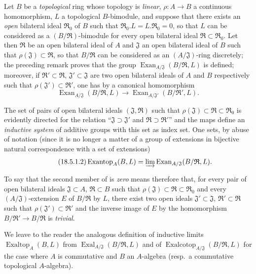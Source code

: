 \begin{env}[18.5.1]
\label{0.18.5.1}
Let $B$ be a \emph{topological} ring whose topology is \emph{linear}, $\rho:A\to B$ a continuous homomorphism, $L$ a topological $B$-bimodule, and suppose that there exists an \emph{open} bilateral ideal $\mathfrak{R}_0$ of $B$ such that $\mathfrak{R}_0.L=L.\mathfrak{R}_0=0$, so that $L$ can be
considered as a $(B/\mathfrak{R})$-bimodule for every open bilateral ideal $\mathfrak{R}\subset\mathfrak{R}_0$.
Let then $\mathfrak{R}$ be an open bilateral ideal of $A$ and $\mathfrak{J}$ an open bilateral ideal of $B$ such that $\rho(\mathfrak{J})\subset\mathfrak{R}$, so that $B/\mathfrak{R}$ can be considered as an $(A/\mathfrak{J})$-ring discretely; the preceding remark proves that the group $\operatorname{Exan}_{A/\mathfrak{J}}(B/\mathfrak{R},L)$ is defined; moreover, if $\mathfrak{R}'\subset\mathfrak{R}$, $\mathfrak{J}'\subset\mathfrak{J}$ are two open bilateral ideals of $A$ and $B$ respectively such that $\rho(\mathfrak{J}')\subset\mathfrak{R}'$, one has by  a canonical homomorphism
\begin{equation}
\tag{18.5.1.1}
  \label{0.18.5.1.1}
  \operatorname{Exan}_{A/\mathfrak{J}}(B/\mathfrak{R},L)\to\operatorname{Exan}_{A/\mathfrak{J}'}(B/\mathfrak{R}',L).
\end{equation}

The set of pairs of open bilateral ideals $(\mathfrak{J},\mathfrak{R})$ such that $\rho(\mathfrak{J})\subset\mathfrak{R}\subset\mathfrak{R}_0$ is evidently directed for the relation ``$\mathfrak{J}\supset\mathfrak{J}'$ and $\mathfrak{R}\supset\mathfrak{R}'$'' and the maps  define an \emph{inductive system} of additive groups with this set as index set.
One sets, by abuse of notation (since it is no longer a matter of a group of extensions in bijective natural correspondence with a set of extensions)
\begin{equation}
\tag{18.5.1.2}
  \label{0.18.5.1.2}
  \operatorname{Exantop}_A(B,L)=\varinjlim\operatorname{Exan}_{A/\mathfrak{J}}(B/\mathfrak{R},L).
\end{equation}

To say that the second member of  is \emph{zero} means therefore that, for every pair of open bilateral ideals $\mathfrak{J}\subset A$, $\mathfrak{R}\subset B$ such that $\rho(\mathfrak{J})\subset\mathfrak{R}\subset\mathfrak{R}_0$ and every $(A/\mathfrak{J})$-extension $E$ of $B/\mathfrak{R}$ by $L$, there exist two open ideals $\mathfrak{J}'\subset\mathfrak{J}$, $\mathfrak{R}'\subset\mathfrak{R}$ such that $\rho(\mathfrak{J}')\subset\mathfrak{R}'$ and the inverse image of $E$ by the homomorphism $B/\mathfrak{R}'\to B/\mathfrak{R}$ is \emph{trivial}.

We leave to the reader the analogous definition of inductive limits $\operatorname{Exaltop}_A(B,L)$ from $\operatorname{Exal}_{A/\mathfrak{J}}(B/\mathfrak{R},L)$ and of $\operatorname{Exalcotop}_{A/\mathfrak{J}}(B/\mathfrak{R},L)$ for the case where $A$ is commutative and $B$ an $A$-algebra (resp.\ a commutative topological $A$-algebra).
\end{env}

